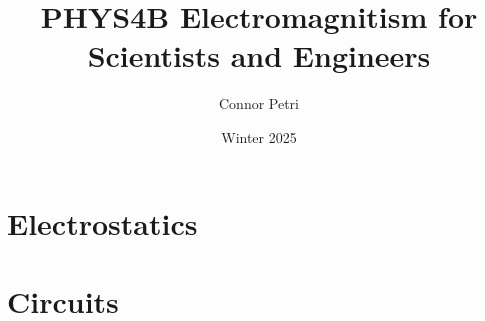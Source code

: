 \documentclass[12pt, letterpaper]{article}
\title{PHYS4B Electromagnitism for \\Scientists and Engineers}
\author{Connor Petri}
\date{Winter 2025}
\begin{document}
\maketitle
\tableofcontents

\pagebreak

\section{Electrostatics}





\section{Circuits}




\end{document}
